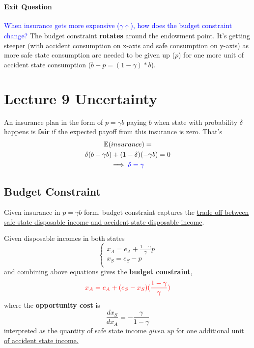 \documentclass[]{article}
\begin{document}
            \paragraph{Exit Question}
            \textcolor{blue}{When insurance gets more expensive ($\gamma \uparrow$), how does the budget constraint change?} The budget constraint \textbf{rotates} around the endowment point. It's getting steeper (with accident consumption on x-axis and safe consumption on y-axis) as more safe state consumption are needed to be given up ($p$) for one more unit of accident state consumption ($b - p = (1 - \gamma)*b$).
    
    \section{Lecture 9 Uncertainty}
        \begin{definition}
            An insurance plan in the form of $p = \gamma b$ paying $b$ when state with probability $\delta$ happens is \textbf{fair} if the expected payoff from this insurance is zero. That's 
            \begin{gather*}
                \mathbb{E}(insurance) = \\
                \delta (b - \gamma b) + (1 - \delta) (- \gamma b) = 0\\
                \implies \textcolor{blue}{\delta = \gamma}
            \end{gather*}
        \end{definition}
        
        \subsection{Budget Constraint}
            \begin{remark} Given insurance in $p = \gamma b$ form, budget constraint captures the \ul{trade off between safe state disposable income and accident state disposable income}.
            \end{remark}
            \par Given disposable incomes in both states
            \[
                \begin{cases}
                    x_A = e_A + \frac{1 - \gamma}{\gamma}p\\
                    x_S = e_S - p \\
                \end{cases}
            \]
            and combining above equations gives the \textbf{budget constraint},
            \[
                \textcolor{red}{
                    x_A = e_A + (e_S - x_S)(\frac{1 - \gamma}{\gamma})
                    }
            \]
            where the \textbf{opportunity cost} is 
            \[
                \frac{dx_S}{dx_A} = - \frac{\gamma}{1 - \gamma} 
            \]
            interpreted as \ul{the quantity of safe state income \emph{given up} for one additional unit of accident state income.}
            
\end{document}

